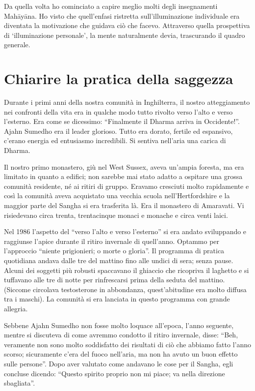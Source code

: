Da quella volta ho cominciato a capire meglio molti degli insegnamenti Mahāyāna. Ho visto che quell'enfasi ristretta sull'illuminazione individuale era diventata la motivazione che guidava ciò che facevo. Attraverso quella prospettiva di `illuminazione personale', la mente naturalmente devia, trascurando il quadro generale.

\section*{Chiarire la pratica della saggezza} 

Durante i primi anni della nostra comunità in Inghilterra, il nostro atteggiamento nei confronti della vita era in qualche modo tutto rivolto verso l'alto e verso l'esterno. Era come se dicessimo: ``Finalmente il Dharma arriva in Occidente!''. Ajahn Sumedho era il leader glorioso. Tutto era dorato, fertile ed espansivo, c'erano energia ed entusiasmo incredibili. Si sentiva nell'aria una carica di Dharma.

Il nostro primo monastero, giù nel West Sussex, aveva un'ampia foresta, ma era limitato in quanto a edifici; non sarebbe mai stato adatto a ospitare una grossa comunità residente, né ai ritiri di gruppo. Eravamo cresciuti molto rapidamente e così la comunità aveva acquistato una vecchia scuola nell'Hertfordshire e la maggior parte del Sangha si era trasferita là. Era il monastero di Amaravati. Vi risiedevano circa trenta, trentacinque monaci e monache e circa venti laici.

Nel 1986 l'aspetto del ``verso l'alto e verso l'esterno'' si era andato sviluppando e raggiunse l'apice durante il ritiro invernale di quell'anno. Optammo per l'approccio ``niente prigionieri; o morte o gloria''. Il programma di pratica quotidiana andava dalle tre del mattino fino alle undici di sera; senza pause. Alcuni dei soggetti più robusti spaccavano il ghiaccio che ricopriva il laghetto e si tuffavano alle tre di notte per rinfrescarsi prima della seduta del mattino. (Siccome circolava testosterone in abbondanza, quest'abitudine era molto diffusa tra i maschi). La comunità si era lanciata in questo programma con grande allegria.

Sebbene Ajahn Sumedho non fosse molto loquace all'epoca, l'anno seguente, mentre si discuteva di come avremmo condotto il ritiro invernale, disse: ``Beh, veramente non sono molto soddisfatto dei risultati di ciò che abbiamo fatto l'anno scorso; sicuramente c'era del fuoco nell'aria, ma non ha avuto un buon effetto sulle persone''. Dopo aver valutato come andavano le cose per il Sangha, egli concluse dicendo: ``Questo spirito proprio non mi piace; va nella direzione sbagliata''.

